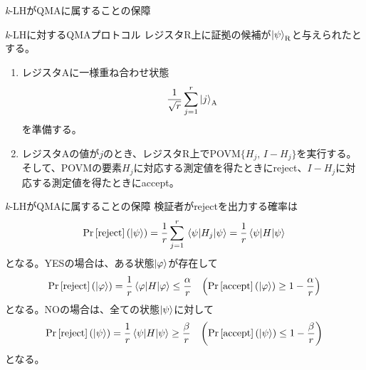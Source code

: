 \documentclass[14pt,aspectratio=169,xcolor=dvipsnames,table,dvipdfmx]{beamer}
\theoremstyle{definition}
\begin{document}
\begin{frame}{\textit{k}-LHがQMAに属することの保障}
  \begin{exampleblock}{\textit{k}-LHに対するQMAプロトコル}
    レジスタR上に証拠の候補が$\ket{\psi}_{\text{R}}$と与えられたとする。
    \begin{enumerate}
      \item レジスタAに一様重ね合わせ状態
            \begin{equation*}
              \frac{1}{\sqrt{r}}\sum_{j=1}^r \ket{j}_{\text{A}}
            \end{equation*}
            を準備する。
      \item レジスタAの値が$j$のとき、レジスタR上でPOVM$\{H_j,\,I-H_j\}$を実行する。
            そして、POVMの要素$H_j$に対応する測定値を得たときにreject、$I-H_j$に対応する測定値を得たときにaccept。
    \end{enumerate}
  \end{exampleblock}
\end{frame}

\begin{frame}{\textit{k}-LHがQMAに属することの保障}
  検証者がrejectを出力する確率は
  \begin{equation*}
    \Pr\qty[\text{reject}](\ket{\psi}) = \frac{1}{r}\sum_{j=1}^{r}\ev{H_j}{\psi} = \frac{1}{r}\ev{H}{\psi}
  \end{equation*}
  となる。YESの場合は、ある状態$\ket{\varphi}$が存在して
  \begin{equation*}
    \Pr\qty[\text{reject}](\ket{\varphi}) = \frac{1}{r}\ev{H}{\varphi} \leq \frac{\alpha}{r} \quad\qty(\Pr\qty[\text{accept}](\ket{\varphi})\geq 1-\frac{\alpha}{r})
  \end{equation*}
  となる。NOの場合は、全ての状態$\ket{\psi}$に対して
  \begin{equation*}
    \Pr\qty[\text{reject}](\ket{\psi}) = \frac{1}{r}\ev{H}{\psi} \geq \frac{\beta}{r} \quad\qty(\Pr\qty[\text{accept}](\ket{\psi})\leq 1-\frac{\beta}{r})
  \end{equation*}
  となる。


\end{frame}
\end{document}
